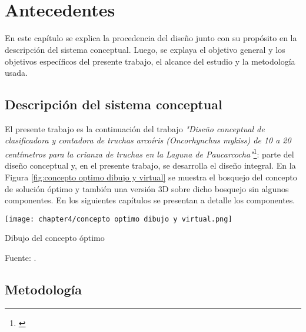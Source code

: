 
\pagestyle{myportland}
\doublespacing
\chapter[\quad\quad\quad\quad ----- Antecedentes]{\\Antecedentes}
\thispagestyle{myportland}

En este capítulo se explica la procedencia del diseño junto con su propósito en la descripción del sistema conceptual. Luego, se explaya el objetivo general y los objetivos específicos del presente trabajo, el alcance del estudio y la metodología usada.

\section{Descripción del sistema conceptual}

El presente trabajo es la continuación del trabajo \textit{"Diseño conceptual de clasificadora y contadora de truchas arcoíris (Oncorhynchus mykiss) de 10 a 20 centímetros para la crianza de truchas en la Laguna de Paucarcocha"}\footnote{\cite{DiazVergara2020}}: parte del diseño conceptual y, en el presente trabajo, se desarrolla el diseño integral. En la Figura \ref{fig:concepto optimo dibujo y virtual} se muestra el bosquejo del concepto de solución óptimo y también una versión 3D sobre dicho bosquejo sin algunos componentes. En los siguientes capítulos se presentan a detalle los componentes.

\begin{myfigure}[H]
	\centering
	\texttt{[image: chapter4/concepto optimo dibujo y virtual.png]}
	\caption{Dibujo del concepto óptimo}
	\begin{myflushcenter}
		Fuente: \cite{DiazVergara2020}.
	\end{myflushcenter}
	\label{fig:concepto optimo dibujo y virtual}
\end{myfigure}

\section{Metodología}


